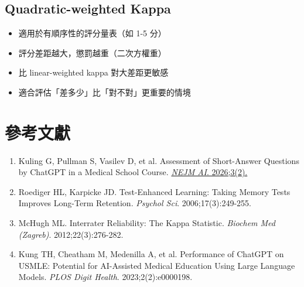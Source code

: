 \documentclass[12pt,a4paper]{article}
\begin{document}
\subsection{Quadratic-weighted Kappa}

\begin{itemize}[leftmargin=2em]
    \item 適用於有順序性的評分量表（如 1-5 分）
    \item 評分差距越大，懲罰越重（二次方權重）
    \item 比 linear-weighted kappa 對大差距更敏感
    \item 適合評估「差多少」比「對不對」更重要的情境
\end{itemize}

\section{參考文獻}

\begin{enumerate}
    \item Kuling G, Pullman S, Vasilev D, et al. Assessment of Short-Answer Questions by ChatGPT in a Medical School Course. \href{https://doi.org/10.1056/AIcs2500239}{\textit{NEJM AI}. 2026;3(2).}

    \item Roediger HL, Karpicke JD. Test-Enhanced Learning: Taking Memory Tests Improves Long-Term Retention. \textit{Psychol Sci}. 2006;17(3):249-255.

    \item McHugh ML. Interrater Reliability: The Kappa Statistic. \textit{Biochem Med (Zagreb)}. 2012;22(3):276-282.

    \item Kung TH, Cheatham M, Medenilla A, et al. Performance of ChatGPT on USMLE: Potential for AI-Assisted Medical Education Using Large Language Models. \textit{PLOS Digit Health}. 2023;2(2):e0000198.
\end{enumerate}
\end{document}
